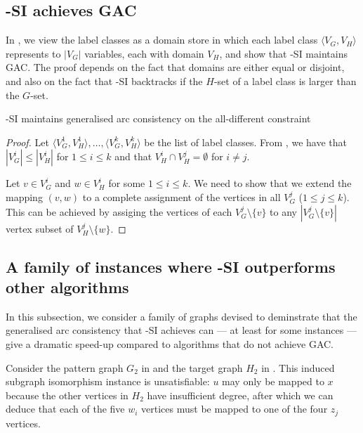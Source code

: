 \subsection{\McSplit-SI achieves GAC}

In , we view the label classes as a domain store in which each label
class $\langle V_G, V_H \rangle$ represents to $|V_G|$ variables, each with domain $V_H$,
and show that \McSplit-SI maintains GAC.  The proof depends on the fact that domains are
either equal or disjoint, and also on the fact that \McSplit-SI backtracks if the $H$-set
of a label class is larger than the $G$-set.

\begin{proposition}\label{gacProposition}
    \McSplit-SI maintains generalised arc consistency on the all-different constraint
\end{proposition}

\begin{proof}
Let $\langle V_G^1, V_H^1 \rangle, \dots, \langle V_G^k, V_H^k \rangle$ be the list of
label classes.  From , we have that $|V_G^i| \leq |V_H^i|$
for $1 \leq i \leq k$ and that $V_H^i \cap V_H^j = \emptyset$ for $i \not= j$.

Let $v \in V_G^i$ and $w \in V_H^i$ for some $1 \leq i \leq k$.  We need to show that we
extend the mapping
$(v,w)$ to a complete assignment of the vertices in all $V_G^j$ ($1 \leq j \leq k$).
This can be achieved by assiging the vertices of
each $V_G^j \setminus \{v\}$ to any $|V_G^j \setminus \{v\}|$ vertex subset of
$V_H^j \setminus \{w\}$.
\end{proof}

\subsection{A family of instances where \McSplit-SI outperforms other algorithms}

In this subsection, we consider a family of graphs devised to deminstrate
that the generalised arc consistency that \McSplit-SI achieves can --- at least
for some instances --- give a dramatic
speed-up compared to algorithms that do not achieve GAC.

Consider the pattern graph $G_2$ in  and the target
graph $H_2$ in .  This induced subgraph isomorphism
instance is unsatisfiable: $u$ may only be mapped to $x$ because the other
vertices in $H_2$ have insufficient degree, after which we can deduce
that each of the five $w_i$ vertices must be mapped to one of the four $z_j$ vertices.

